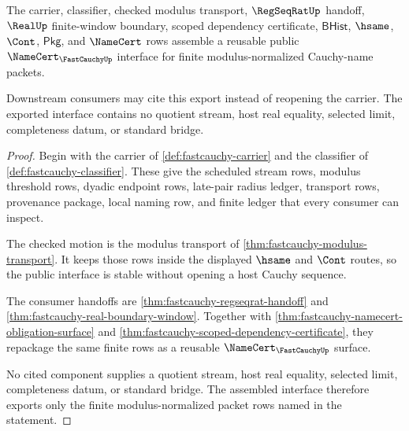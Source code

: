 \begin{theorem}
\label{thm:fastcauchy-public-interface-export}
The carrier, classifier, checked modulus transport, $\RegSeqRatUp$ handoff,
$\RealUp$ finite-window boundary, scoped dependency certificate,
$\mathsf{BHist}$, $\hsame$, $\Cont$, $\mathsf{Pkg}$, and $\NameCert$ rows
assemble a reusable public $\NameCert_{\FastCauchyUp}$ interface for finite
modulus-normalized Cauchy-name packets.

Downstream consumers may cite this export instead of reopening the carrier. The
exported interface contains no quotient stream, host real equality, selected
limit, completeness datum, or standard bridge.
\end{theorem}
\begin{proof}
Begin with the carrier of \autoref{def:fastcauchy-carrier} and the classifier of
\autoref{def:fastcauchy-classifier}. These give the scheduled stream rows,
modulus threshold rows, dyadic endpoint rows, late-pair radius ledger,
transport rows, provenance package, local naming row, and finite ledger that
every consumer can inspect.

The checked motion is the modulus transport of
\autoref{thm:fastcauchy-modulus-transport}. It keeps those rows inside the
displayed $\hsame$ and $\Cont$ routes, so the public interface is stable without
opening a host Cauchy sequence.

The consumer handoffs are \autoref{thm:fastcauchy-regseqrat-handoff} and
\autoref{thm:fastcauchy-real-boundary-window}. Together with
\autoref{thm:fastcauchy-namecert-obligation-surface} and
\autoref{thm:fastcauchy-scoped-dependency-certificate}, they repackage the same
finite rows as a reusable $\NameCert_{\FastCauchyUp}$ surface.

No cited component supplies a quotient stream, host real equality, selected
limit, completeness datum, or standard bridge. The assembled interface therefore
exports only the finite modulus-normalized packet rows named in the statement.
\end{proof}


